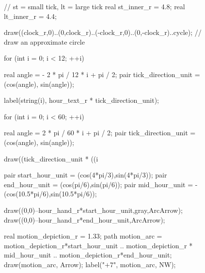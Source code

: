 \documentclass[../gatm.tex]{subfiles}
\begin{document}
\begin{figure}[h]
\begin{center}
\begin{minipage}[c]{0.35\textwidth}
\begin{center}
\begin{minipage}[b]{\textwidth}
\begin{asy}[width=0.7\textwidth]
						// st = small tick, lt = large tick
						real st_inner_r = 4.8;
						real lt_inner_r = 4.4;
						
						draw((clock_r,0)..(0,clock_r)..(-clock_r,0)..(0,-clock_r)..cycle); // draw an approximate circle
						
						for (int i = 0; i < 12; ++i) {
						real angle = - 2 * pi / 12 * i + pi / 2;
						pair tick_direction_unit = (cos(angle), sin(angle));
						
						label(string(i), hour_text_r * tick_direction_unit);
						}
						
						
						for (int i = 0; i < 60; ++i) {
						real angle = 2 * pi / 60 * i + pi / 2;
						pair tick_direction_unit = (cos(angle), sin(angle));
						
						draw((tick_direction_unit * ((i %
						}
						
						pair start_hour_unit = (cos(4*pi/3),sin(4*pi/3));
						pair end_hour_unit = (cos(pi/6),sin(pi/6));
						pair mid_hour_unit = -(cos(10.5*pi/6),sin(10.5*pi/6));
						
						draw((0,0)--hour_hand_r*start_hour_unit,gray,ArcArrow);
						draw((0,0)--hour_hand_r*end_hour_unit,ArcArrow);
						
						real motion_depiction_r = 1.33;
						path motion_arc = motion_depiction_r*start_hour_unit .. motion_depiction_r * mid_hour_unit .. motion_depiction_r*end_hour_unit;
						draw(motion_arc, Arrow);
						label("$+7$", motion_arc, NW);
					\end{asy}
				\end{minipage}
			\end{center}
			\vspace*{-2\baselineskip}
			\begin{center}
				\begin{minipage}[t]{\textwidth}
					\label{fig:clock_arithm}
				\end{minipage}
			\end{center}
		\end{minipage}
	\end{center}
\end{figure}
\end{document}
